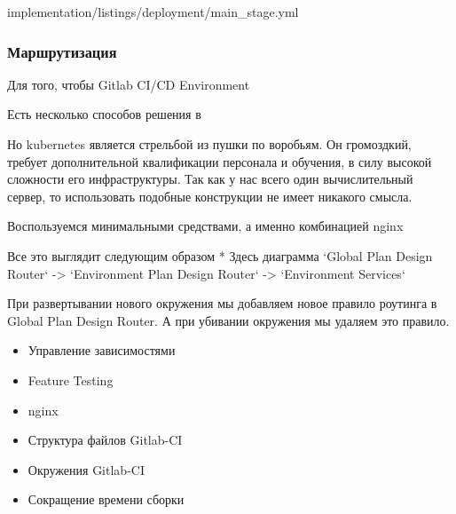 
\vskip 5mm


{implementation/listings/deployment/main_stage.yml}
\vskip 5mm

\subsubsection{{Маршрутизация}}

Для того, чтобы Gitlab CI/CD Environment

Есть несколько способов решения в

Но kubernetes является стрельбой из пушки по воробьям.
Он громоздкий, требует дополнительной квалификации персонала и обучения, в силу высокой сложности его инфраструктуры.
Так как у нас всего один вычислительный сервер, то использовать подобные конструкции не имеет никакого смысла.


Воспользуемся минимальными средствами, а именно комбинацией nginx

Все это выглядит следующим образом
* Здесь диаграмма `Global Plan Design Router` -> `Environment Plan Design Router` -> `Environment Services`

При развертывании нового окружения мы добавляем новое правило роутинга в Global Plan Design Router.
А при убивании окружения мы удаляем это правило.


\begin{itemize}
    \item Управление зависимостями
    \item Feature Testing
    \item nginx
    \item Структура файлов Gitlab-CI
    \item Окружения Gitlab-CI
    \item Сокращение времени сборки
\end{itemize}
